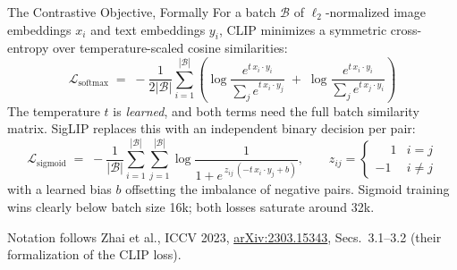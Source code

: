 \begin{frame}{The Contrastive Objective, Formally}
  For a batch $\mathcal{B}$ of $\ell_2$-normalized image embeddings $x_i$ and text embeddings $y_i$,
  CLIP minimizes a symmetric cross-entropy over temperature-scaled cosine similarities:
  \begin{equation*}
    \mathcal{L}_{\mathrm{softmax}} \;=\; -\frac{1}{2|\mathcal{B}|} \sum_{i=1}^{|\mathcal{B}|} \left(
      \log \frac{e^{t\, x_i \cdot y_i}}{\sum_{j} e^{t\, x_i \cdot y_j}}
      \;+\; \log \frac{e^{t\, x_i \cdot y_i}}{\sum_{j} e^{t\, x_j \cdot y_i}} \right)
  \end{equation*}
  The temperature $t$ is \emph{learned}, and both terms need the full batch similarity matrix.
  SigLIP replaces this with an independent binary decision per pair:
  \begin{equation*}
    \mathcal{L}_{\mathrm{sigmoid}} \;=\; -\frac{1}{|\mathcal{B}|} \sum_{i=1}^{|\mathcal{B}|} \sum_{j=1}^{|\mathcal{B}|}
      \log \frac{1}{1 + e^{\,z_{ij}\,(-t\, x_i \cdot y_j + b)}},
    \qquad z_{ij} = \begin{cases} \phantom{-}1 & i = j \\ -1 & i \neq j \end{cases}
  \end{equation*}
  with a learned bias $b$ offsetting the imbalance of negative pairs. Sigmoid training wins clearly
  below batch size 16k; both losses saturate around 32k.
  \vspace{0.2em}

  {\scriptsize Notation follows Zhai et al., ICCV 2023, \href{https://arxiv.org/abs/2303.15343}{arXiv:2303.15343},
  Secs.~3.1--3.2 (their formalization of the CLIP loss).}
\end{frame}

